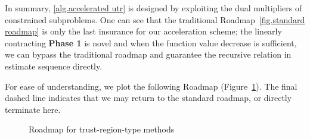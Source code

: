 \documentclass{article}
\theoremstyle{plain}
\theoremstyle{definition}
\theoremstyle{remark}
\begin{document}
In summary, \cref{alg.accelerated utr} is designed by exploiting the dual multipliers of constrained subproblems. One can see that the traditional Roadmap~\ref{fig.standard roadmap} is only the last insurance for our acceleration scheme; the linearly contracting \textbf{Phase 1} is novel and when the function value decrease is sufficient, we can bypass the traditional roadmap and guarantee the recursive relation in estimate sequence directly.

For ease of understanding, we plot the following Roadmap (Figure~\ref{fig.roadmap tr}). The final dashed line indicates that we may return to the standard roadmap, or directly terminate here.
\begin{figure}[!h]
    \centering
    \noindent{}
    \caption{Roadmap for trust-region-type methods}
    \label{fig.roadmap tr}
\end{figure}
\end{document}
